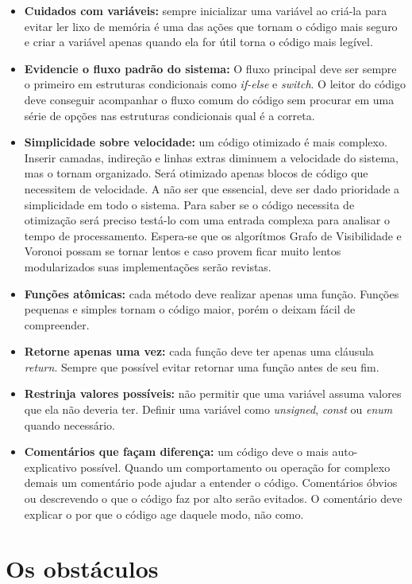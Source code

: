 \begin{itemize}
  \item \textbf{Cuidados com variáveis:} sempre inicializar uma variável ao criá-la para evitar ler lixo de memória é uma das ações que tornam o código mais seguro e criar a variável apenas quando ela for útil torna o código mais legível.
  \item \textbf{Evidencie o fluxo padrão do sistema:} O fluxo principal deve ser sempre o primeiro em estruturas condicionais como \textit{if-else} e \textit{switch}. O leitor do código deve conseguir acompanhar o fluxo comum do código sem procurar em uma série de opções nas estruturas condicionais qual é a correta.
  \item \textbf{Simplicidade sobre velocidade:} um código otimizado é mais complexo. Inserir camadas, indireção e linhas extras diminuem a velocidade do sistema, mas o tornam organizado. Será otimizado apenas blocos de código que necessitem de velocidade. A não ser que essencial, deve ser dado prioridade a simplicidade em todo o sistema. Para saber se o código necessita de otimização será preciso testá-lo com uma entrada complexa para analisar o tempo de processamento. Espera-se que os algorítmos Grafo de Visibilidade e Voronoi possam se tornar lentos e caso provem ficar muito lentos modularizados suas implementações serão revistas.
  \item \textbf{Funções atômicas:} cada método deve realizar apenas uma função. Funções pequenas e simples tornam o código maior, porém o deixam fácil de compreender.
  \item \textbf{Retorne apenas uma vez:} cada função deve ter apenas uma cláusula \textit{return}. Sempre que possível evitar retornar uma função antes de seu fim.
  \item \textbf{Restrinja valores possíveis:} não permitir que uma variável assuma valores que ela não deveria ter. Definir uma variável como \textit{unsigned}, \textit{const} ou \textit{enum} quando necessário.
  \item \textbf{Comentários que façam diferença:} um código deve o mais auto-explicativo possível. Quando um comportamento ou operação for complexo demais um comentário pode ajudar a entender o código. Comentários óbvios ou descrevendo o que o código faz por alto serão evitados. O comentário deve explicar o por que o código age daquele modo, não como.
\end{itemize} 

\section{Os obstáculos}

